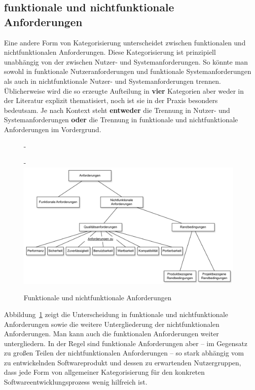 \subsection{funktionale und nichtfunktionale Anforderungen}
\label{sec:Kap-6.2.2}

Eine andere Form von Kategorisierung unterscheidet zwischen funktionalen und nichtfunktionalen Anforderungen. Diese Kategorisierung ist prinzipiell unabhängig von der zwischen Nutzer- und Systemanforderungen. So könnte man sowohl in funktionale Nutzeranforderungen und funktionale Systemanforderungen als auch in nichtfunktionale Nutzer- und Systemanforderungen trennen. Üblicherweise wird die so erzeugte Aufteilung in \textbf{vier} Kategorien aber weder in der Literatur explizit thematisiert, noch ist sie in der Praxis besonders bedeutsam. Je nach Kontext steht \textbf{entweder} die Trennung in Nutzer- und Systemanforderungen \textbf{oder} die Trennung in funktionale und nichtfunktionale Anforderungen im Vordergrund.

\begin{figure}[h!]
	\begin{addmargin*}[0cm]{-\marginparwidth}
	\begin{addmargin*}[0cm]{-\marginparsep}
		\centering
		\includegraphics[scale=0.79]{Bilder/Kapitel-6/funktional.pdf}
		\caption{Funktionale und nichtfunktionale Anforderungen}
		\label{fig:funktionale_nichtfunktionale_anforderungen}
	\end{addmargin*}
	\end{addmargin*}
\end{figure}

Abbildung~\ref{fig:funktionale_nichtfunktionale_anforderungen} zeigt die Unterscheidung in funktionale und nichtfunktionale Anforderungen sowie die weitere Untergliederung der nichtfunktionalen Anforderungen. Man kann auch die funktionalen Anforderungen weiter untergliedern. In der Regel sind funktionale Anforderungen aber -- im Gegensatz zu großen Teilen der nichtfunktionalen Anforderungen -- so stark abhängig vom zu entwickelnden Softwareprodukt und dessen zu erwartenden Nutzergruppen, dass jede Form von allgemeiner Kategorisierung für den konkreten Softwareentwicklungsprozess wenig hilfreich ist.

